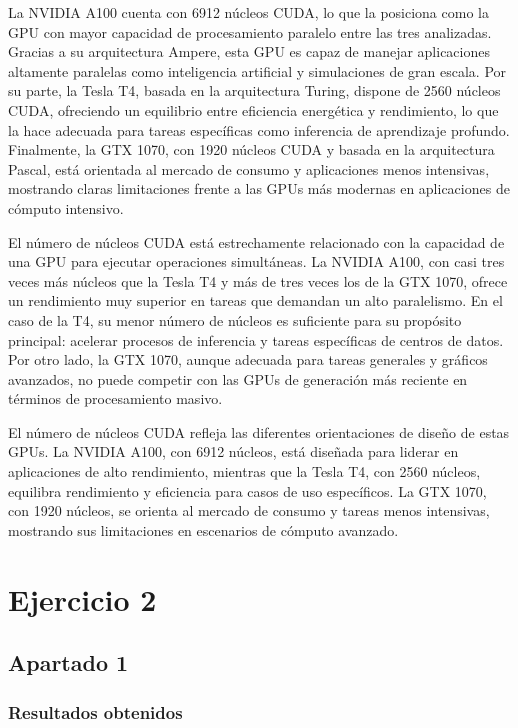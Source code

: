 \documentclass{article}
\begin{document}
			La NVIDIA A100 cuenta con 6912 núcleos CUDA, lo que la posiciona como la GPU con mayor capacidad de procesamiento paralelo entre las tres analizadas. Gracias a su arquitectura Ampere, esta GPU es capaz de manejar aplicaciones altamente paralelas como inteligencia artificial y simulaciones de gran escala. Por su parte, la Tesla T4, basada en la arquitectura Turing, dispone de 2560 núcleos CUDA, ofreciendo un equilibrio entre eficiencia energética y rendimiento, lo que la hace adecuada para tareas específicas como inferencia de aprendizaje profundo. Finalmente, la GTX 1070, con 1920 núcleos CUDA y basada en la arquitectura Pascal, está orientada al mercado de consumo y aplicaciones menos intensivas, mostrando claras limitaciones frente a las GPUs más modernas en aplicaciones de cómputo intensivo.

			El número de núcleos CUDA está estrechamente relacionado con la capacidad de una GPU para ejecutar operaciones simultáneas. La NVIDIA A100, con casi tres veces más núcleos que la Tesla T4 y más de tres veces los de la GTX 1070, ofrece un rendimiento muy superior en tareas que demandan un alto paralelismo. En el caso de la T4, su menor número de núcleos es suficiente para su propósito principal: acelerar procesos de inferencia y tareas específicas de centros de datos. Por otro lado, la GTX 1070, aunque adecuada para tareas generales y gráficos avanzados, no puede competir con las GPUs de generación más reciente en términos de procesamiento masivo.

			El número de núcleos CUDA refleja las diferentes orientaciones de diseño de estas GPUs. La NVIDIA A100, con 6912 núcleos, está diseñada para liderar en aplicaciones de alto rendimiento, mientras que la Tesla T4, con 2560 núcleos, equilibra rendimiento y eficiencia para casos de uso específicos. La GTX 1070, con 1920 núcleos, se orienta al mercado de consumo y tareas menos intensivas, mostrando sus limitaciones en escenarios de cómputo avanzado.

\section{Ejercicio 2}

	\subsection{Apartado 1}

		\subsubsection{Resultados obtenidos}
\end{document}
